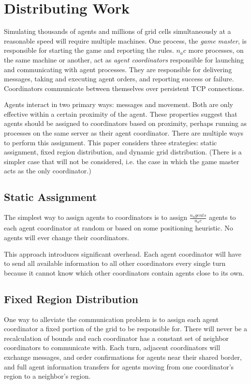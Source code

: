 \section{Distributing Work}

Simulating thousands of agents and millions of grid cells simultaneously at a reasonable speed will require multiple machines. One process, the \emph{game master}, is responsible for starting the game and reporting the rules. $n_ac$ more processes, on the same machine or another, act as \emph{agent coordinators} responsible for launching and communicating with agent processes. They are responsible for delivering messages, taking and executing agent orders, and reporting success or failure. Coordinators communicate between themselves over persistent TCP connections.

Agents interact in two primary ways: messages and movement. Both are only effective within a certain proximity of the agent. These properties suggest that agents should be assigned to coordinators based on proximity, perhaps running as processes on the same server as their agent coordinator. There are multiple ways to perform this assignment. This paper considers three strategies: static assignment, fixed region distribution, and dynamic grid distribution. (There is a simpler case that will not be considered, i.e. the case in which the game master acts as the only coordinator.)

\subsection{Static Assignment}

The simplest way to assign agents to coordinators is to assign $\frac{n_agents}{n_ac}$ agents to each agent coordinator at random or based on some positioning heuristic. No agents will ever change their coordinators.

This approach introduces significant overhead. Each agent coordinator will have to send all available information to all other coordinators every single turn because it cannot know which other coordinators contain agents close to its own.

\subsection{Fixed Region Distribution}

One way to alleviate the communication problem is to assign each agent coordinator a fixed portion of the grid to be responsible for. There will never be a recalculation of bounds and each coordinator has a constant set of neighbor coordinators to communicate with. Each turn, adjacent coordinators will exchange messages, and order confirmations for agents near their shared border, and full agent information transfers for agents moving from one coordinator's region to a neighbor's region.

